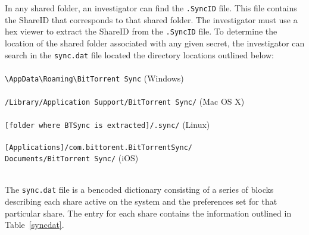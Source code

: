 \documentclass{jdfsl}
\begin{document}
In any shared folder, an investigator can find the \texttt{.SyncID} file. This file contains the ShareID that corresponds to that shared folder. The investigator must use a hex viewer to extract the ShareID from the \texttt{.SyncID} file. To determine the location of the shared folder associated with any given secret, the investigator can search in the \texttt{sync.dat} file located the directory locations outlined below:\\ \\ \footnotesize \texttt{\textbackslash AppData\textbackslash Roaming\textbackslash BitTorrent Sync} (Windows)\\\\
 \texttt{/Library/Application Support/BitTorrent Sync/} (Mac OS X)\\
\\\texttt{[folder where BTSync is extracted]/.sync/} (Linux)\\\\
\texttt{[Applications]/com.bittorent.BitTorrentSync/\\Documents/BitTorrent Sync/} (iOS)
\\\\
\normalsize

The \texttt{sync.dat} file is a bencoded dictionary consisting of a series of blocks describing each share active on the system and the preferences set for that particular share. The entry for each share contains the information outlined in Table~\ref{syncdat}.
\end{document}
